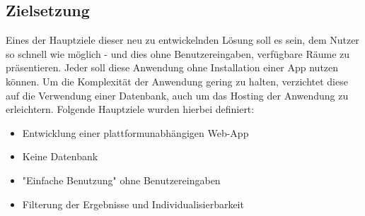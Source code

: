 \newpage

\subsection{Zielsetzung}

Eines der Hauptziele dieser neu zu entwickelnden Lösung soll es sein,
dem Nutzer so schnell wie möglich - und dies ohne Benutzereingaben,
verfügbare Räume zu präsentieren. Jeder soll diese Anwendung ohne
Installation einer App nutzen können.
Um die Komplexität der Anwendung gering zu halten, verzichtet
diese auf die Verwendung einer Datenbank, auch um das Hosting
der Anwendung zu erleichtern. Folgende Hauptziele wurden hierbei definiert:
\begin{itemize}
    \itemsep-0.4em
    \item Entwicklung einer plattformunabhängigen Web-App
    \item Keine Datenbank
    \item "Einfache Benutzung" ohne Benutzereingaben
    \item Filterung der Ergebnisse und Individualisierbarkeit
\end{itemize}

